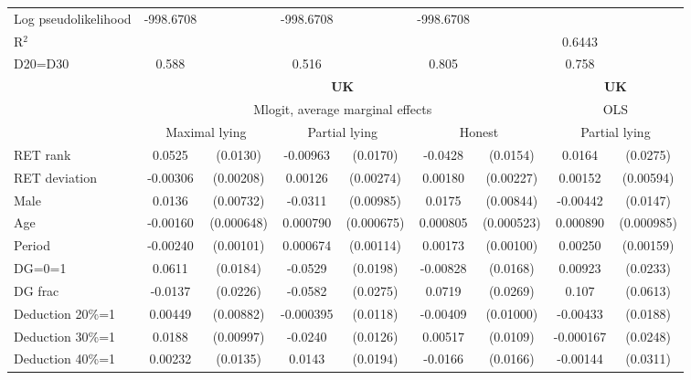 \begin{tabular}{l|cccccc|cc}
Log pseudolikelihood  &  -998.6708   &         &        -998.6708            &         &         -998.6708           &         &           &   \\ 
R$^2$      &                  &         &                  &         &                  &         &         0.6443  &   \\ 
D20=D30         &    0.588         &         &    0.516         &         &    0.805         &         &    0.758         &         \\
\hline\hline
&\multicolumn{6}{c|}{\bf UK}&\multicolumn{2}{c}{\bf UK}\\ &\multicolumn{6}{c|}{Mlogit, average marginal effects }&\multicolumn{2}{c}{OLS}\\
                &\multicolumn{2}{c}{Maximal lying}&\multicolumn{2}{c}{Partial lying}&\multicolumn{2}{c}{Honest}  &\multicolumn{2}{c}{Partial lying}\\
\hline
RET rank        &   0.0525\sym{***}& (0.0130)& -0.00963         & (0.0170)&  -0.0428\sym{***}& (0.0154)&   0.0164         & (0.0275)\\
RET deviation   & -0.00306         &(0.00208)&  0.00126         &(0.00274)&  0.00180         &(0.00227)&  0.00152         &(0.00594)\\
Male            &   0.0136\sym{*}  &(0.00732)&  -0.0311\sym{***}&(0.00985)&   0.0175\sym{**} &(0.00844)& -0.00442         & (0.0147)\\
Age             & -0.00160\sym{**} &(0.000648)& 0.000790         &(0.000675)& 0.000805         &(0.000523)& 0.000890         &(0.000985)\\
Period          & -0.00240\sym{**} &(0.00101)& 0.000674         &(0.00114)&  0.00173\sym{*}  &(0.00100)&  0.00250         &(0.00159)\\
DG=0=1          &   0.0611\sym{***}& (0.0184)&  -0.0529\sym{***}& (0.0198)& -0.00828         & (0.0168)&  0.00923         & (0.0233)\\
DG frac         &  -0.0137         & (0.0226)&  -0.0582\sym{**} & (0.0275)&   0.0719\sym{***}& (0.0269)&    0.107\sym{*}  & (0.0613)\\
Deduction 20\%=1&  0.00449         &(0.00882)&-0.000395         & (0.0118)& -0.00409         &(0.01000)& -0.00433         & (0.0188)\\
Deduction 30\%=1&   0.0188\sym{*}  &(0.00997)&  -0.0240\sym{*}  & (0.0126)&  0.00517         & (0.0109)&-0.000167         & (0.0248)\\
Deduction 40\%=1&  0.00232         & (0.0135)&   0.0143         & (0.0194)&  -0.0166         & (0.0166)& -0.00144         & (0.0311)\\

\end{tabular}
